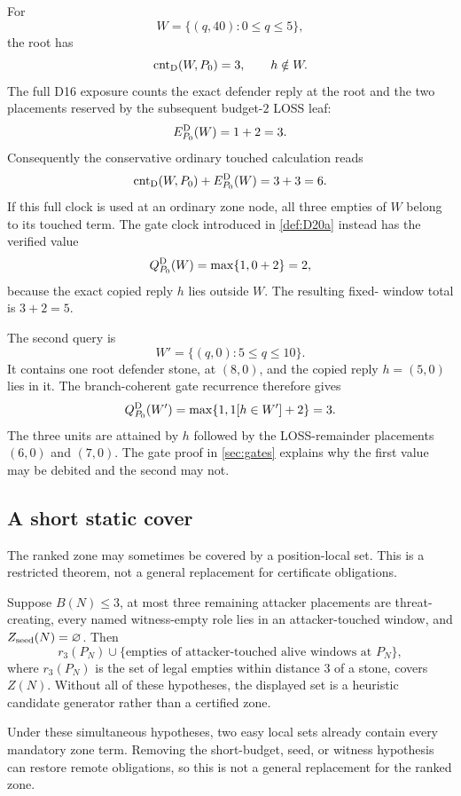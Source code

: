 For
\[
 W=\{(q,40):0\le q\le5\},
\]
the root has
\[
 \operatorname{cnt}_{\mathrm{D}}(W,P_0)=3,
 \qquad h\notin W.
\]
The full D16 exposure counts the exact defender reply at the root and the two
placements reserved by the subsequent budget-$2$ LOSS leaf:
\begin{equation}
 E_{P_0}^{\mathrm{D}}(W)=1+2=3.
 \label{eq:running-full-exposure}
\end{equation}
Consequently the conservative ordinary touched calculation reads
\[
 \operatorname{cnt}_{\mathrm{D}}(W,P_0)+E_{P_0}^{\mathrm{D}}(W)=3+3=6.
\]
If this full clock is used at an ordinary zone node, all three empties of $W$
belong to its touched term.  The gate clock introduced in \cref{def:D20a}
instead has the verified value
\[
 Q_{P_0}^{\mathrm{D}}(W)=\max\{1,0+2\}=2,
\]
because the exact copied reply $h$ lies outside $W$.  The resulting fixed-
window total is $3+2=5$.

The second query is
\[
 W'=\{(q,0):5\le q\le10\}.
\]
It contains one root defender stone, at $(8,0)$, and the copied reply
$h=(5,0)$ lies in it.  The branch-coherent gate recurrence therefore gives
\[
 Q_{P_0}^{\mathrm{D}}(W')=\max\{1,1[h\in W']+2\}=3.
\]
The three units are attained by $h$ followed by the LOSS-remainder placements
$(6,0)$ and $(7,0)$.  The gate proof in \cref{sec:gates} explains why the
first value may be debited and the second may not.

\subsection{A short static cover}

The ranked zone may sometimes be covered by a position-local set.  This is a
restricted theorem, not a general replacement for certificate obligations.

\begin{theorem}
\label{thm:T5}
\upshape
Suppose $B(N)\le3$, at most three remaining attacker placements are
threat-creating, every named witness-empty role lies in an attacker-touched
window, and $Z_{\mathrm{seed}}(N)=\varnothing$.  Then
\[
 r_3(P_N)\cup
 \{\text{empties of attacker-touched alive windows at }P_N\},
\]
where $r_3(P_N)$ is the set of legal empties within distance $3$ of a stone,
covers $Z(N)$.  Without all of these hypotheses, the displayed set is a
heuristic candidate generator rather than a certified zone.
\end{theorem}

\begin{plainterms}
Under these simultaneous hypotheses, two easy local sets already contain
every mandatory zone term.  Removing the short-budget, seed, or witness
hypothesis can restore remote obligations, so this is not a general
replacement for the ranked zone.
\end{plainterms}

